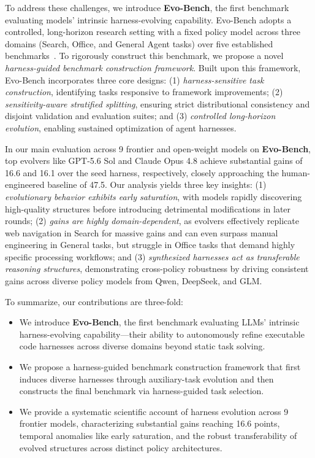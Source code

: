 To address these challenges, we introduce \textbf{Evo-Bench}, the first benchmark evaluating models' intrinsic harness-evolving capability. Evo-Bench adopts a controlled, long-horizon research setting with a fixed policy model across three domains (Search, Office, and General Agent tasks) over five established benchmarks~\cite{browsecomp,hle,gdpval,apexagents,claweval}. To rigorously construct this benchmark, we propose a novel \emph{harness-guided benchmark construction framework}. Built upon this framework, Evo-Bench incorporates three core designs: (1) \emph{harness-sensitive task construction}, identifying tasks responsive to framework improvements; (2) \emph{sensitivity-aware stratified splitting}, ensuring strict distributional consistency and disjoint validation and evaluation suites; and (3) \emph{controlled long-horizon evolution}, enabling sustained optimization of agent harnesses.

In our main evaluation across 9 frontier and open-weight models on \textbf{Evo-Bench}, top evolvers like GPT-5.6 Sol and Claude Opus 4.8 achieve substantial gains of 16.6 and 16.1 over the seed harness, respectively, closely approaching the human-engineered baseline of 47.5. Our analysis yields three key insights:
(1) \emph{evolutionary behavior exhibits early saturation}, with models rapidly discovering high-quality structures before introducing detrimental modifications in later rounds;
(2) \emph{gains are highly domain-dependent}, as evolvers effectively replicate web navigation in Search for massive gains and can even surpass manual engineering in General tasks, but struggle in Office tasks that demand highly specific processing workflows; and
(3) \emph{synthesized harnesses act as transferable reasoning structures}, demonstrating cross-policy robustness by driving consistent gains across diverse policy models from Qwen, DeepSeek, and GLM.

To summarize, our contributions are three-fold:

\begin{itemize}
\item We introduce \textbf{Evo-Bench}, the first benchmark evaluating LLMs' intrinsic harness-evolving capability---their ability to autonomously refine executable code harnesses across diverse domains beyond static task solving.

\item We propose a harness-guided benchmark construction framework that first induces diverse harnesses through auxiliary-task evolution and then constructs the final benchmark via harness-guided task selection.

\item We provide a systematic scientific account of harness evolution across 9 frontier models, characterizing substantial gains reaching 16.6 points, temporal anomalies like early saturation, and the robust transferability of evolved structures across distinct policy architectures.
\end{itemize}

